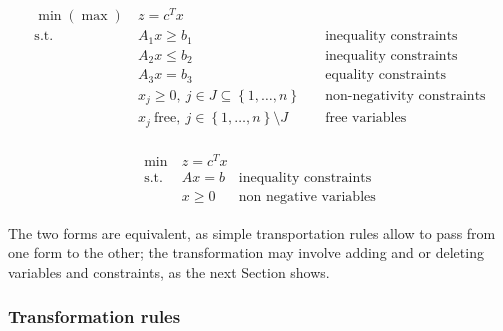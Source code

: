 \documentclass[english]{article}
\begin{document}
\begin{gather}
  \begin{aligned}
    \min (\max) \  & z = c^T x                                                                                                \\
    \text{s.t.} \  & A_1 x \geq b_1 \quad                                                 & \text{inequality constraints}     \\
                   & A_2 x \leq b_2 \quad                                                 & \text{inequality constraints}     \\
                   & A_3 x = b_3 \quad                                                    & \text{equality constraints}       \\
                   & x_j \geq 0,\ j \in J \subseteq \left\{ 1, \ldots, n \right\} \quad   & \text{non-negativity constraints} \\
                   & x_j \ \text{free}, \ j \in \left\{ 1, \ldots, n \right\} \setminus J & \text{free variables}
  \end{aligned}
  \label{eq:linear-programming-general-form}
\end{gather}

\begin{gather}
  \begin{aligned}
    \min \         & z = c^T x &                               \\
    \text{s.t.} \  & Ax = b    & \text{inequality constraints} \\
                   & x \geq 0  & \text{non negative variables}
  \end{aligned}
  \label{eq:linear-programming-standard-form}
\end{gather}

The two forms are equivalent, as simple transportation rules allow to pass from one form to the other;
the transformation may involve adding and or deleting variables and constraints, as the next Section shows.

\subsubsection{Transformation rules}
\end{document}
